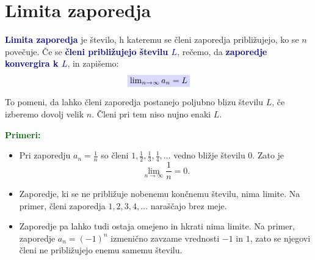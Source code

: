 \documentclass[12pt,a4paper]{article}
\begin{document}
\noindent{}

\section{Limita zaporedja}

\textcolor{darkblue}{\textbf{Limita zaporedja}} je število, h kateremu se členi zaporedja približujejo, ko se $n$ povečuje. Če se \textcolor{darkblue}{\textbf{členi približujejo številu $L$}}, rečemo, da \textcolor{darkblue}{\textbf{zaporedje konvergira k $L$}}, in zapišemo:
\[
    \colorbox{blue!15}{$\lim_{n\to\infty} a_n=L$}
\]

To pomeni, da lahko členi zaporedja postanejo poljubno blizu številu $L$, če izberemo dovolj velik $n$. Členi pri tem niso nujno enaki $L$.

\medskip

\textcolor{darkgreen}{\textbf{Primeri:}} 
\begin{itemize}
    \item Pri zaporedju $a_n=\frac{1}{n}$ so členi $1, \frac12, \frac13, \frac14, \ldots$ vedno bližje številu $0$. Zato je
\[
    \lim_{n\to\infty}\frac{1}{n}=0.
\]

    \item Zaporedje, ki se ne približuje nobenemu končnemu številu, nima limite. Na primer, členi zaporedja $1, 2, 3, 4, \ldots$ naraščajo brez meje.

    \item Zaporedje pa lahko tudi ostaja omejeno in hkrati nima limite. Na primer, zaporedje $a_n=(-1)^n$ izmenično zavzame vrednosti $-1$ in $1$, zato se njegovi členi ne približujejo enemu samemu številu.
\end{itemize}
\end{document}
